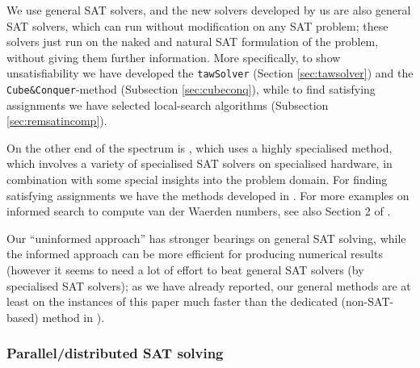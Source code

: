 \documentclass[final,3p,times]{elsarticle}
\theoremstyle{definition}
\newcommand{\tawsolver}{\texttt{tawSolver}}
\newcommand{\cubeconq}{\texttt{Cube\:\&\:Conquer}}
\begin{document}
We use general SAT solvers, and the new solvers developed by us are also general SAT solvers, which can run without modification on any SAT problem; these solvers just run on the naked and natural SAT formulation of the problem, without giving them further information. More specifically, to show unsatisfiability we have developed the \tawsolver{} (Section \ref{sec:tawsolver}) and the \cubeconq-method (Subsection \ref{sec:cubeconq}), while to find satisfying assignments we have selected local-search algorithms (Subsection \ref{sec:remsatincomp}).

On the other end of the spectrum is \cite{KourilPaulW26,Kouril2012W34}, which uses a highly specialised method, which involves a variety of specialised SAT solvers on specialised hardware, in combination with some special insights into the problem domain. For finding satisfying assignments we have the methods developed in \cite{herwig,HeuleWalsh2010SolutionsSymmetry,HeuleWalsh2010SolutionsSymmetryW}. For more examples on informed search to compute van der Waerden numbers, see also Section 2 of \cite{ahmed2013}.

Our ``uninformed approach'' has stronger bearings on general SAT solving, while the informed approach can be more efficient for producing numerical results (however it seems to need a lot of effort to beat general SAT solvers (by specialised SAT solvers); as we have already reported, our general methods are at least on the instances of this paper much faster than the dedicated (non-SAT-based) method in  \cite{Schweitzer2009Ramsey}).



\subsubsection{Parallel/distributed SAT solving}
\label{sec:parallelSAT}
\end{document}
